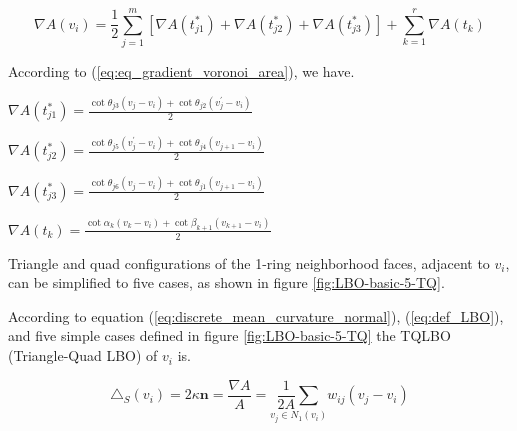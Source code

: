 \documentclass[10pt, conference]{IEEEtran}
\begin{document}
{\small 
\begin{equation}
\nabla A\left(v_{i}\right)=\frac{1}{2}\overset{m}{\underset{j=1}{\sum}}\left[\nabla A\left(t_{j1}^{*}\right)+\nabla A\left(t_{j2}^{*}\right)+\nabla A\left(t_{j3}^{*}\right)\right]+\overset{r}{\underset{k=1}{\sum}}\nabla A\left(t_{k}\right)\label{eq:EqGrad}
\end{equation}
}{\small \par}

According to (\ref{eq:eq_gradient_voronoi_area}), we have.

\begin{center}
$\nabla A\left(t_{j1}^{*}\right)=\frac{\cot\theta_{j3}\left(v_{j}-v_{i}\right)+\cot\theta_{j2}\left(v_{j}^{\prime}-v_{i}\right)}{2}$
\par\end{center}

\begin{center}
$\nabla A\left(t_{j2}^{*}\right)=\frac{\cot\theta_{j5}\left(v_{j}^{\prime}-v_{i}\right)+\cot\theta_{j4}\left(v_{j+1}-v_{i}\right)}{2}$
\par\end{center}

\begin{center}
$\nabla A\left(t_{j3}^{*}\right)=\frac{\cot\theta_{j6}\left(v_{j}-v_{i}\right)+\cot\theta_{j1}\left(v_{j+1}-v_{i}\right)}{2}$
\par\end{center}

\begin{center}
$\nabla A\left(t_{k}\right)=\frac{\cot\alpha_{k}\left(v_{k}-v_{i}\right)+\cot\beta_{k+1}\left(v_{k+1}-v_{i}\right)}{2}$
\par\end{center}

Triangle and quad configurations of the 1-ring neighborhood faces,
adjacent to $v_{i}$, can be simplified to five cases, as shown in
figure \ref{fig:LBO-basic-5-TQ}.

According to equation (\ref{eq:discrete_mean_curvature_normal}),
(\ref{eq:def_LBO}), and five simple cases defined in figure \ref{fig:LBO-basic-5-TQ}
the TQLBO (Triangle-Quad LBO) of $v_{i}$ is.

\begin{equation}
\triangle_{S}\left(v_{i}\right)=2\kappa\mathbf{n}=\frac{\nabla A}{A}=\underset{v_{j}\in N_{1}\left(v_{i}\right)}{\frac{1}{2A}\sum}w_{ij}\left(v_{j}-v_{i}\right)
\end{equation}
\end{document}
